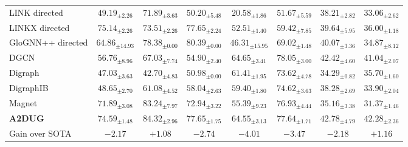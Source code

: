 \begin{table*}[t]
{\begin{tabular}{l|ccccccc}
LINK directed & $49.19_{\pm2.26}$ & $71.89_{\pm3.63}$ & $50.20_{\pm5.48}$ & $20.58_{\pm1.86}$ & $51.67_{\pm5.59}$ & $38.21_{\pm2.82}$ & $33.06_{\pm2.62}$ \\
LINKX directed & $75.14_{\pm2.26}$ & $73.51_{\pm2.26}$ & $77.65_{\pm2.24}$ & $52.51_{\pm1.40}$ & $59.42_{\pm7.85}$ & $39.64_{\pm5.95}$ & $36.00_{\pm1.18}$ \\
GloGNN++ directed & $64.86_{\pm14.93}$ & $78.38_{\pm0.00}$ & \colorbox{mycolor}{$80.39_{\pm0.00}$} & $46.31_{\pm15.95}$ & $69.02_{\pm1.48}$ & $40.07_{\pm3.36}$ & $34.87_{\pm8.12}$ \\ \midrule
DGCN & $56.76_{\pm8.96}$ & $67.03_{\pm7.74}$ & $54.90_{\pm2.40}$ & $64.65_{\pm3.41}$ & $78.05_{\pm3.00}$ & $42.42_{\pm4.60}$ & $41.04_{\pm2.07}$ \\
Digraph & $47.03_{\pm3.63}$ & $42.70_{\pm4.83}$ & $50.98_{\pm0.00}$ & $61.41_{\pm1.95}$ & $73.62_{\pm4.78}$ & $34.29_{\pm0.82}$ & $35.70_{\pm1.60}$ \\
DigraphIB & $48.65_{\pm2.70}$ & $61.08_{\pm4.52}$ & $58.04_{\pm2.63}$ & $59.40_{\pm1.80}$ & $74.62_{\pm3.63}$ & $38.28_{\pm2.69}$ & $33.90_{\pm2.04}$ \\
Magnet & $71.89_{\pm3.08}$ & \colorbox{mycolor}{$83.24_{\pm7.97}$} & $72.94_{\pm3.22}$ & $55.39_{\pm9.23}$ & $76.93_{\pm4.44}$ & $35.16_{\pm3.38}$ & $31.37_{\pm1.46}$ \\ \midrule
\textbf{A2DUG} & $74.59_{\pm1.48}$ & \colorbox{mycolor}{$84.32_{\pm2.96}$} & $77.65_{\pm1.75}$ & $64.55_{\pm3.13}$ & $77.64_{\pm1.71}$ & \colorbox{mycolor}{$42.78_{\pm4.79}$} & \colorbox{mycolor}{$42.28_{\pm2.36}$} \\
Gain over SOTA & $-2.17$ & $+1.08$ & $-2.74$ & $-4.01$ & $-3.47$ & $-2.18$ & $+1.16$ \\ \bottomrule
\end{tabular}
}
\vspace{3mm}

\end{table*}
